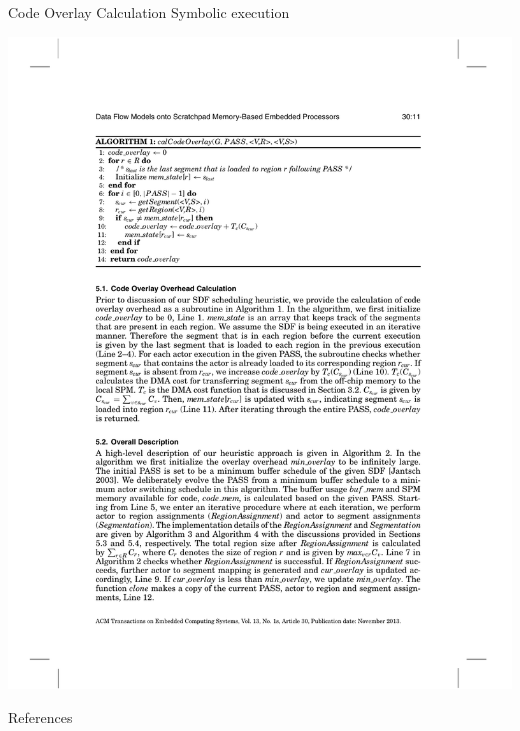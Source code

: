 \documentclass{beamer}
\begin{document}
\begin{frame}{Code Overlay Calculation}
  Symbolic execution
  \begin{center}
    \hspace*{-0.1\textwidth}
    \includegraphics[width=1.2\textwidth]{algo1}
  \end{center}
\end{frame}

\begin{frame}[allowframebreaks]{References}

  
  

\end{frame}
\end{document}
